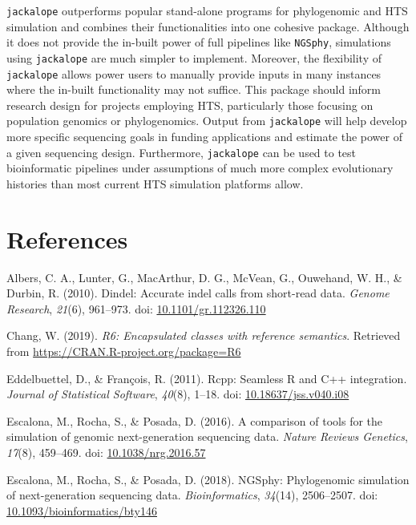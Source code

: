 \documentclass[12pt,]{article}
\begin{document}
\texttt{jackalope} outperforms popular stand-alone programs for phylogenomic and HTS
simulation and combines their functionalities into one cohesive package.
Although it does not provide the in-built power of full pipelines like \texttt{NGSphy},
simulations using \texttt{jackalope} are much simpler to implement.
Moreover, the flexibility of \texttt{jackalope} allows power users to manually
provide inputs in many instances where the in-built functionality may not suffice.
This package should inform research design for projects employing HTS,
particularly those focusing on population genomics or phylogenomics.
Output from \texttt{jackalope} will help develop more specific sequencing goals
in funding applications and estimate the power of a given sequencing design.
Furthermore, \texttt{jackalope} can be used to test bioinformatic pipelines under
assumptions of much more complex evolutionary histories than most current HTS
simulation platforms allow.

\hypertarget{references}{%
\section{References}\label{references}}


\hypertarget{refs}{}
\leavevmode\hypertarget{ref-Albers_2010}{}%
Albers, C. A., Lunter, G., MacArthur, D. G., McVean, G., Ouwehand, W. H., \& Durbin, R. (2010). Dindel: Accurate indel calls from short-read data. \emph{Genome Research}, \emph{21}(6), 961--973. doi: \href{https://doi.org/10.1101/gr.112326.110}{10.1101/gr.112326.110}

\leavevmode\hypertarget{ref-Chang_2019}{}%
Chang, W. (2019). \emph{R6: Encapsulated classes with reference semantics}. Retrieved from \url{https://CRAN.R-project.org/package=R6}

\leavevmode\hypertarget{ref-Eddelbuettel_2011}{}%
Eddelbuettel, D., \& François, R. (2011). Rcpp: Seamless R and C++ integration. \emph{Journal of Statistical Software}, \emph{40}(8), 1--18. doi: \href{https://doi.org/10.18637/jss.v040.i08}{10.18637/jss.v040.i08}

\leavevmode\hypertarget{ref-Escalona_2016}{}%
Escalona, M., Rocha, S., \& Posada, D. (2016). A comparison of tools for the simulation of genomic next-generation sequencing data. \emph{Nature Reviews Genetics}, \emph{17}(8), 459--469. doi: \href{https://doi.org/10.1038/nrg.2016.57}{10.1038/nrg.2016.57}

\leavevmode\hypertarget{ref-Escalona_2018}{}%
Escalona, M., Rocha, S., \& Posada, D. (2018). NGSphy: Phylogenomic simulation of next-generation sequencing data. \emph{Bioinformatics}, \emph{34}(14), 2506--2507. doi: \href{https://doi.org/10.1093/bioinformatics/bty146}{10.1093/bioinformatics/bty146}
\end{document}
